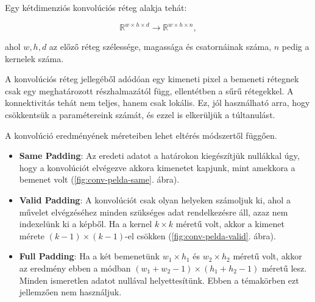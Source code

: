 \noindent
Egy kétdimenziós konvolúciós réteg alakja tehát:

\[  \mathbb{R}^{w \times h \times d} \rightarrow \mathbb{R}^{w \times h \times n} , \]

\noindent
ahol $ w, h,d $ az előző réteg szélessége, magassága és csatornáinak száma, 
$ n $ pedig a kernelek száma. 

A konvolúciós réteg jellegéből adódóan egy kimeneti pixel a bemeneti rétegnek csak egy meghatározott részhalmazától függ, ellentétben a sűrű rétegekkel. A konnektivitás tehát nem teljes, hanem csak lokális. Ez, jól használható arra, hogy csökkentsük a paramétereink számát, és ezzel is elkerüljük a túltanulást.



A konvolúció eredményének méreteiben lehet eltérés módszertől függően. 

\begin{itemize}
	\item 
	\textbf{Same Padding}: Az eredeti adatot a határokon kiegészítjük nullákkal úgy, hogy a konvolúciót elvégezve akkora kimenetet kapjunk, mint amekkora a bemenet volt (\ref{fig:conv-pelda-same}. ábra).
	
	\item 
	\textbf{Valid Padding}: A konvolúciót csak olyan helyeken számoljuk ki, ahol a művelet elvégzéséhez minden szükséges adat rendelkezésre áll, azaz nem indexelünk ki a képből. Ha a kernel $ k \times k $ méretű volt, akkor a kimenet mérete $ (k-1) \times (k-1) $-el csökken (\ref{fig:conv-pelda-valid}. ábra).
	
	\item 
	\textbf{Full Padding}: Ha a két bemenetünk $ w_1 \times h_1 $ és $ w_2 \times h_2 $ méretű volt, akkor az eredmény ebben a módban $ (w_1 + w_2 - 1) \times (h_1 + h_2 - 1) $ méretű lesz. Minden ismeretlen adatot nullával helyettesítünk. Ebben a témakörben ezt jellemzően nem használjuk.
	
\end{itemize}


